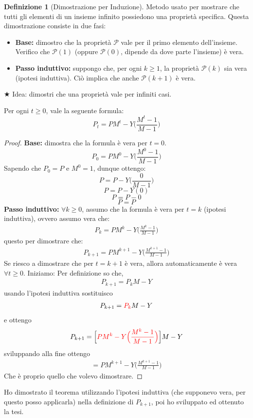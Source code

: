 \documentclass{article}  %
\theoremstyle{definition}
\newtheorem{definition}{Definizione}[section]
\begin{document}
\begin{definition}[Dimostrazione per Induzione]
	Metodo usato per mostrare che tutti gli elementi di un insieme infinito possiedono una proprietà specifica. Questa dimostrazione
	consiste in due fasi:
	\begin{itemize}
		\item \textbf{Base:} dimostro che la proprietà \(\mathcal{P}\) vale per il primo elemento dell'insieme. Verifico che $\mathcal{P}(1)$ (oppure $\mathcal{P}(0)$, dipende da dove parte l'insieme) è vera.
		\item \textbf{Passo induttivo:} suppongo che, per ogni $k \geq 1$, la proprietà $\mathcal{P}(k)$ sia vera (ipotesi induttiva). Ciò implica che anche $\mathcal{P}(k+1)$ è vera.
	\end{itemize}

\end{definition}
\(\bigstar\) Idea: dimostri che una proprietà vale per infiniti casi.
\begin{esempio}[Esempio]
	\footnotesize %
	Per ogni $t \geq 0$, vale la seguente formula: \newline
	\[
		P_t=PM^t-Y\Big(\frac{M^t-1}{M-1}\Big)
	\]
	\begin{proof}
		\textbf{Base:} dimostra che la formula è vera per $t=0$.
		\[
			P_0=PM^0-Y\Big(\frac{M^0-1}{M-1}\Big)
		\]
		Sapendo che $P_0=P$ e $M^0=1$, dunque ottengo:
		\[
			P=P-Y\Big(\frac{0}{M-1}\Big)
		\]
		\[
			P=P-Y(0)
		\]
		\[
			P=P-0
		\]
		\[
			P=P
		\]
		\textbf{Passo induttivo:} \(\forall{k}\geq0\), assumo che la formula è vera per $t=k$ (ipotesi induttiva), ovvero assumo vera che:
		\begin{align*}
			P_k=PM^k-Y\Big(\frac{M^k-1}{M-1}\Big) \tag*{(ipotesi induttiva)}
		\end{align*}
		questo per dimostrare che:
		\begin{align*}
			P_{k+1}=PM^{k+1}-Y\Big(\frac{M^{k+1}-1}{M-1}\Big) \tag*{(tesi)}
		\end{align*}
		Se riesco a dimostrare che per $t=k+1$ è vera, allora automaticamente è vera $\forall{t}\geq 0$.
		Iniziamo:\newline
		Per definizione so che,
		\begin{align*}
			P_{k+1}=P_kM-Y
		\end{align*}
		usando l'ipotesi induttiva sostituisco
		\begin{align*}
			P_{k+1}= \textcolor{red}{P_k} M-Y
		\end{align*}
		e ottengo
		\begin{align*}
			P_{k+1}= \Big[\textcolor{red}{PM^k-Y\Big(\frac{M^k-1}{M-1}\Big)} \Big] M-Y
		\end{align*}
		sviluppando alla fine ottengo
		\begin{align*}
			= PM^{k+1}-Y \Big(\frac{M^{k+1}-1}{M-1}\Big)
		\end{align*}
		Che è proprio quello che volevo dimostrare.
	\end{proof}
	Ho dimostrato il teorema utilizzando l'ipotesi induttiva (che supponevo vera, per questo posso applicarla)
	nella definizione di $P_{k+1}$, poi ho sviluppato ed ottenuto la tesi.
\end{esempio}
\end{document}
